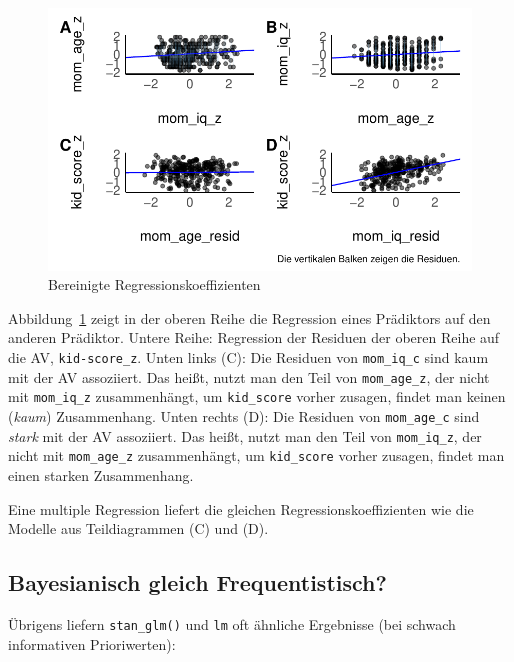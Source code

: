 \documentclass[
  a4paper,
  DIV=11]{scrreprt}
\theoremstyle{definition}
\theoremstyle{remark}
\begin{document}
\begin{figure}

{\centering \includegraphics{./metrische-AV_files/figure-pdf/fig-bereinigt-1.pdf}

}

\caption{\label{fig-bereinigt}Bereinigte Regressionskoeffizienten}

\end{figure}

Abbildung~\ref{fig-bereinigt} zeigt in der oberen Reihe die Regression
eines Prädiktors auf den anderen Prädiktor. Untere Reihe: Regression der
Residuen der oberen Reihe auf die AV, \texttt{kid-score\_z}. Unten links
(C): Die Residuen von \texttt{mom\_iq\_c} sind kaum mit der AV
assoziiert. Das heißt, nutzt man den Teil von \texttt{mom\_age\_z}, der
nicht mit \texttt{mom\_iq\_z} zusammenhängt, um \texttt{kid\_score}
vorher zusagen, findet man keinen (\emph{kaum}) Zusammenhang. Unten
rechts (D): Die Residuen von \texttt{mom\_age\_c} sind \emph{stark} mit
der AV assoziiert. Das heißt, nutzt man den Teil von
\texttt{mom\_iq\_z}, der nicht mit \texttt{mom\_age\_z} zusammenhängt,
um \texttt{kid\_score} vorher zusagen, findet man einen starken
Zusammenhang.

Eine multiple Regression liefert die gleichen Regressionskoeffizienten
wie die Modelle aus Teildiagrammen (C) und (D).

\hypertarget{bayesianisch-gleich-frequentistisch}{%
\subsection{Bayesianisch gleich
Frequentistisch?}\label{bayesianisch-gleich-frequentistisch}}

Übrigens liefern \texttt{stan\_glm()} und \texttt{lm} oft ähnliche
Ergebnisse (bei schwach informativen Prioriwerten):
\end{document}
